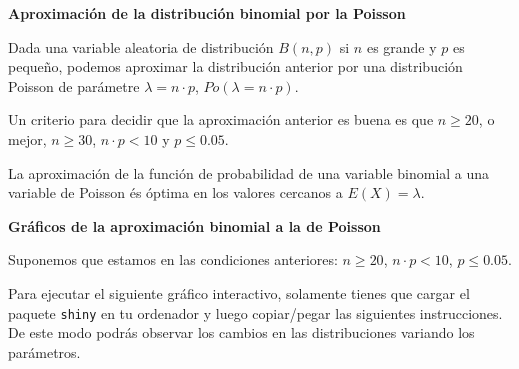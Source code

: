 \documentclass[]{book}
\begin{document}
\textbf{Aproximación de la distribución binomial por la Poisson}

Dada una variable aleatoria de distribución \(B(n,p)\) si \(n\) es grande y \(p\) es pequeño, podemos aproximar la distribución anterior por una distribución Poisson de parámetre \(\lambda=n\cdot p\), \(Po(\lambda = n\cdot p)\).

Un criterio para decidir que la aproximación anterior es buena es que
\(n\geq 20\), o mejor, \(n\geq 30\), \(n\cdot p < 10\) y \(p\leq 0.05.\)

La aproximación de la función de probabilidad de una variable binomial a una variable de Poisson és óptima en los valores cercanos a \(E(X)=\lambda\).

\textbf{Gráficos de la aproximación binomial a la de Poisson}

Suponemos que estamos en las condiciones anteriores: \(n\geq 20\), \(n\cdot p < 10\), \(p\leq 0.05\).

Para ejecutar el siguiente gráfico interactivo, solamente tienes que cargar el paquete \texttt{shiny} en tu ordenador y luego copiar/pegar las siguientes instrucciones. De este modo podrás observar los cambios en las distribuciones variando los parámetros.
\end{document}
